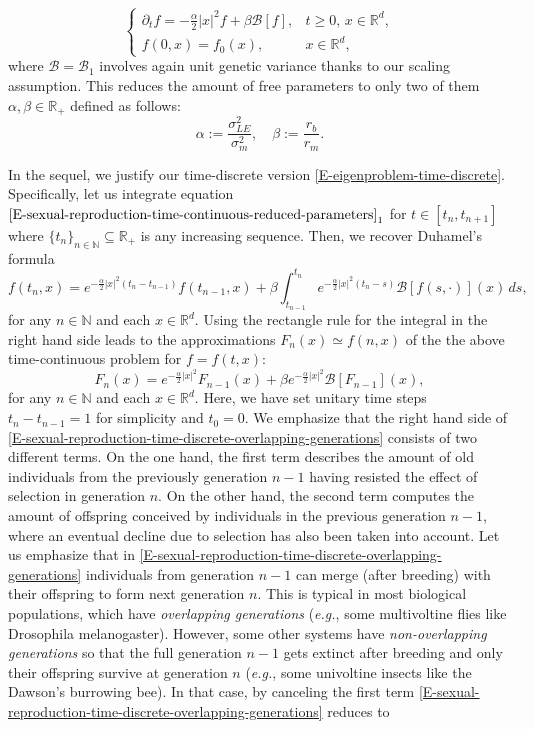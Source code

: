 \documentclass[reqno]{amsart}
\numberwithin{equation}{section}
\begin{document}
{\begin{equation}\label{E-sexual-reproduction-time-continuous-reduced-parameters}
\left\{\begin{array}{ll}
\partial_t f=-\frac{\alpha}{2}\vert x\vert^2 f+\beta \mathcal{B}[f], & t\geq 0,\,x\in \mathbb{R}^d,\\
f(0,x)=f_0(x), & x\in \mathbb{R}^d,
\end{array}\right.
\end{equation}
where $\mathcal{B}=\mathcal{B}_1$ involves again unit genetic variance thanks to our scaling assumption. This reduces the amount of free parameters to only two of them $\alpha,\beta\in \mathbb{R}_+$ defined as follows:
$$\alpha:=\frac{\sigma^2_{LE}}{\sigma_m^2},\quad \beta:=\frac{r_b}{r_m}.$$

In the sequel, we justify our time-discrete version \eqref{E-eigenproblem-time-discrete}. Specifically, let us integrate equation $\eqref{E-sexual-reproduction-time-continuous-reduced-parameters}_1$ for $t\in[t_n,t_{n+1}]$ where $\{t_n\}_{n\in \mathbb{N}}\subseteq \mathbb{R}_+$ is any increasing sequence. Then, we recover Duhamel's formula
$$f(t_n,x)=e^{-\frac{\alpha}{2}\vert x\vert^2(t_n-t_{n-1})}f(t_{n-1},x)+\beta\int_{t_{n-1}}^{t_n} e^{-\frac{\alpha}{2}\vert x\vert^2(t_n-s)}\mathcal{B}[f(s,\cdot)](x)\,ds,$$
for any $n\in \mathbb{N}$ and each $x\in \mathbb{R}^d$. Using the rectangle rule for the integral in the right hand side leads to the approximations $F_n(x)\simeq f(n,x)$ of the the above time-continuous problem for $f=f(t,x)$:
\begin{equation}\label{E-sexual-reproduction-time-discrete-overlapping-generations}
F_n(x)=e^{-\frac{\alpha}{2}\vert x\vert^2}F_{n-1}(x)+\beta e^{-\frac{\alpha}{2}\vert x\vert^2}\mathcal{B}[F_{n-1}](x),
\end{equation}
for any $n\in \mathbb{N}$ and each $x\in \mathbb{R}^d$. Here, we have set unitary time steps $t_n-t_{n-1}=1$ for simplicity and $t_0=0$. We emphasize that the right hand side of \eqref{E-sexual-reproduction-time-discrete-overlapping-generations} consists of two different terms. On the one hand, the first term describes the amount of old individuals from the previously generation $n-1$ having resisted the effect of selection in generation $n$. On the other hand, the second term computes the amount of offspring conceived by individuals in the previous generation $n-1$, where an eventual decline due to selection has also been taken into account. Let us emphasize that in \eqref{E-sexual-reproduction-time-discrete-overlapping-generations} individuals from generation $n-1$ can merge (after breeding) with their offspring to form next generation $n$. This is typical in most biological populations, which have \textit{overlapping generations} ({\em e.g.}, some multivoltine flies like Drosophila melanogaster). However, some other systems have {\it non-overlapping generations} so that the full generation $n-1$ gets extinct after breeding and only their offspring survive at generation $n$ ({\em e.g.}, some univoltine insects like the Dawson's burrowing bee). In that case, by canceling the first term \eqref{E-sexual-reproduction-time-discrete-overlapping-generations} reduces to
}
\end{document}
